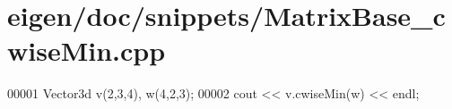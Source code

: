 \hypertarget{eigen_2doc_2snippets_2_matrix_base__cwise_min_8cpp_source}{}\section{eigen/doc/snippets/\+Matrix\+Base\+\_\+cwise\+Min.cpp}
\label{eigen_2doc_2snippets_2_matrix_base__cwise_min_8cpp_source}

\begin{DoxyCode}
00001 Vector3d v(2,3,4), w(4,2,3);
00002 cout << v.cwiseMin(w) << endl;
\end{DoxyCode}
